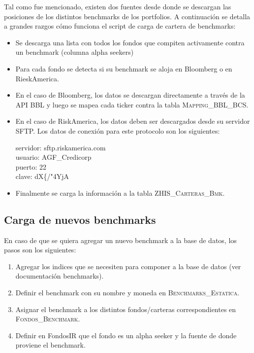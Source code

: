 \documentclass{article}
\begin{document}
Tal como fue mencionado, existen dos fuentes desde donde se descargan las posiciones de los distintos benchmarks de los portfolios. A continuación se detalla a grandes razgos cómo funciona el script de carga de cartera de benchmarks:
\begin{itemize}
	\item Se descarga una lista con todos los fondos que compiten activamente contra un benchmark (columna alpha seekers)
	\item Para cada fondo se detecta si su benchmark se aloja en Bloomberg o en RieskAmerica.
	\item En el caso de Bloomberg, los datos se descargan directamente a través de la API BBL y luego se mapea cada ticker contra la tabla \textsc{Mapping\_BBL\_BCS}.
	\item En el caso de RiskAmerica, los datos deben ser descargados desde su servidor SFTP. Los datos de conexión para este protocolo son los siguientes:
	\begin{center}
	servidor: sftp.riskamerica.com\\
	usuario: AGF\_Credicorp\\
	puerto: 22\\
	clave: dX\{/"4YjA
	\end{center}
	\item Finalmente se carga la información a la tabla \textsc{ZHIS\_Carteras\_Bmk}.
\end{itemize}

\subsection{Carga de nuevos benchmarks}

En caso de que se quiera agregar un nuevo benchmark a la base de datos, los pasos son los siguientes:

\begin{enumerate}
\item Agregar los indices que se necesiten para componer a la base de datos (ver documentación benchmarks). 
\item Definir el benchmark con su nombre y moneda en \textsc{Benchmarks\_Estatica}.
\item Asignar el benchmark a los distintos fondos/carteras correspondientes en \textsc{Fondos\_Benchmark}.
\item Definir en FondosIR que el fondo es un alpha seeker y la fuente de donde proviene el benchmark.
\end{enumerate}
\end{document}
